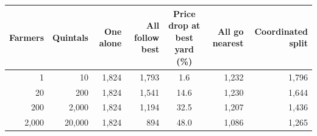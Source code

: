 \renewcommand{\arraystretch}{1.25}
\footnotesize
\begin{tabular}{|r|r|r|r|c|r|r|}
\hline
\textbf{Farmers} & \textbf{Quintals} & \textbf{One alone} & \textbf{All follow best} & \textbf{Price drop at best yard (\%)} & \textbf{All go nearest} & \textbf{Coordinated split} \\
\hline
1 & 10 & 1,824 & 1,793 & 1.6 & 1,232 & 1,796 \\
\hline
20 & 200 & 1,824 & 1,541 & 14.6 & 1,230 & 1,644 \\
\hline
200 & 2,000 & 1,824 & 1,194 & 32.5 & 1,207 & 1,436 \\
\hline
2,000 & 20,000 & 1,824 & 894 & 48.0 & 1,086 & 1,265 \\
\hline
\end{tabular}
